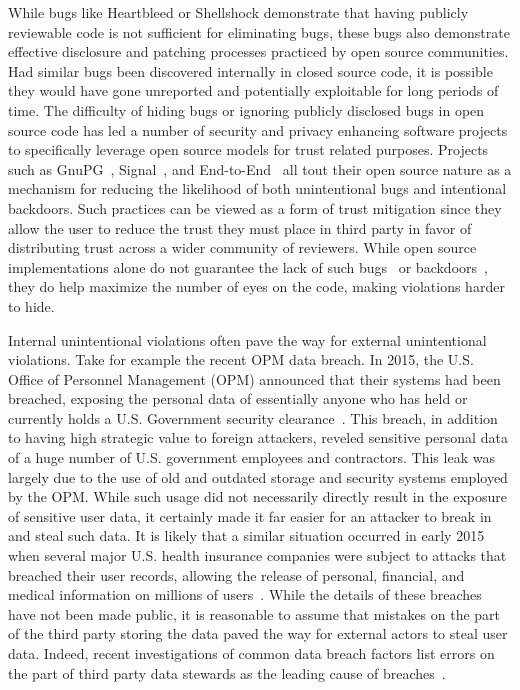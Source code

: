While bugs like Heartbleed or Shellshock demonstrate that having
publicly reviewable code is not sufficient for eliminating bugs, these
bugs also demonstrate effective disclosure and patching processes
practiced by open source communities. Had similar bugs been discovered
internally in closed source code, it is possible they would have gone
unreported and potentially exploitable for long periods of time. The
difficulty of hiding bugs or ignoring publicly disclosed bugs in open
source code has led a number of security and privacy enhancing
software projects to specifically leverage open source models for
trust related purposes. Projects such as GnuPG~\cite{gnupg},
Signal~\cite{openwhisper}, and End-to-End~\cite{google-endtoend,
  yahoo-endtoend} all tout their open source nature as a mechanism for
reducing the likelihood of both unintentional bugs and intentional
backdoors. Such practices can be viewed as a form of trust mitigation
since they allow the user to reduce the trust they must place in third
party in favor of distributing trust across a wider community of
reviewers. While open source implementations alone do not guarantee
the lack of such bugs~\cite{frosch2014} or
backdoors~\cite{thompson1984}, they do help maximize the number of
eyes on the code, making violations harder to hide.

Internal unintentional violations often pave the way for external
unintentional violations. Take for example the recent OPM data
breach. In 2015, the U.S. Office of Personnel Management (OPM)
announced that their systems had been breached, exposing the personal
data of essentially anyone who has held or currently holds a
U.S. Government security clearance~\cite{ars-opmhack,
  opm-cybersecurityincidents}. This breach, in addition to having high
strategic value to foreign attackers, reveled sensitive personal data
of a huge number of U.S. government employees and contractors. This
leak was largely due to the use of old and outdated storage and
security systems employed by the OPM. While such usage did not
necessarily directly result in the exposure of sensitive user data, it
certainly made it far easier for an attacker to break in and steal
such data. It is likely that a similar situation occurred in early
2015 when several major U.S. health insurance companies were subject
to attacks that breached their user records, allowing the release of
personal, financial, and medical information on millions of
users~\cite{krebs-anthem, krebs-premera}. While the details of these
breaches have not been made public, it is reasonable to assume that
mistakes on the part of the third party storing the data paved the way
for external actors to steal user data. Indeed, recent investigations
of common data breach factors list errors on the part of third party
data stewards as the leading cause of breaches~\cite{gallagher-blame,
  verizon-2016breach}.

